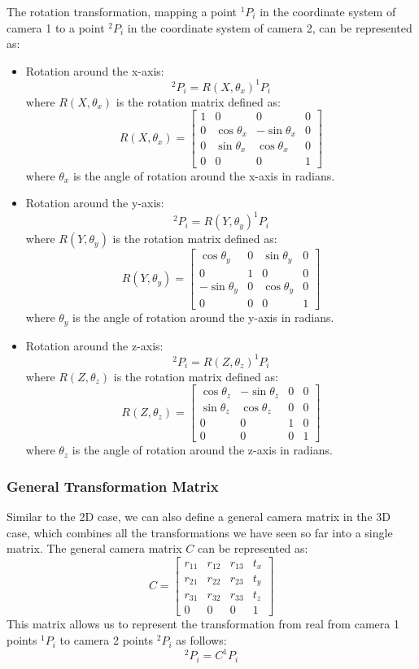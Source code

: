 The rotation transformation, mapping a point \( ^1P_i \) in the coordinate system of camera 1 to a point \( ^2P_i \) in the coordinate system of camera 2, can be represented as:
\begin{itemize}
    \item Rotation around the x-axis:
    \[ ^2P_i = R(X, \theta_x) ^1P_i \]
    where \( R(X, \theta_x) \) is the rotation matrix defined as:
    \[ R(X, \theta_x) = \begin{bmatrix}
        1 & 0 & 0 & 0 \\
        0 & \cos \theta_x & -\sin \theta_x & 0 \\
        0 & \sin \theta_x & \cos \theta_x & 0 \\
        0 & 0 & 0 & 1
    \end{bmatrix} \]
    where \( \theta_x \) is the angle of rotation around the x-axis in radians.
    \item Rotation around the y-axis:
    \[ ^2P_i = R(Y, \theta_y) ^1P_i \]
    where \( R(Y, \theta_y) \) is the rotation matrix defined as:
    \[ R(Y, \theta_y) = \begin{bmatrix}
        \cos \theta_y & 0 & \sin \theta_y & 0 \\
        0 & 1 & 0 & 0 \\
        -\sin \theta_y & 0 & \cos \theta_y & 0 \\
        0 & 0 & 0 & 1
    \end{bmatrix} \]
    where \( \theta_y \) is the angle of rotation around the y-axis in radians.
    \item Rotation around the z-axis:
    \[ ^2P_i = R(Z, \theta_z) ^1P_i \]
    where \( R(Z, \theta_z) \) is the rotation matrix defined as:
    \[ R(Z, \theta_z) = \begin{bmatrix}
        \cos \theta_z & -\sin \theta_z & 0 & 0 \\
        \sin \theta_z & \cos \theta_z & 0 & 0 \\
        0 & 0 & 1 & 0 \\
        0 & 0 & 0 & 1
    \end{bmatrix} \]
    where \( \theta_z \) is the angle of rotation around the z-axis in radians.
\end{itemize}

\subsubsection{General Transformation Matrix}
Similar to the 2D case, we can also define a general camera matrix in the 3D case, which combines all the transformations we have seen so far into a single matrix.
The general camera matrix \( C \) can be represented as:
\[ C = \begin{bmatrix}
    r_{11} & r_{12} & r_{13} & t_x \\
    r_{21} & r_{22} & r_{23} & t_y \\
    r_{31} & r_{32} & r_{33} & t_z \\
    0 & 0 & 0 & 1
\end{bmatrix} \]
This matrix allows us to represent the transformation from real from camera 1 points  \( ^1P_i \) to camera 2 points  \( ^2P_i \)  as follows:
\[ ^2P_i = C ^1P_i \]

